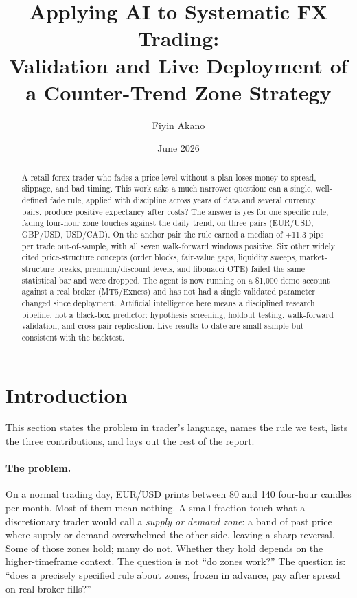 \documentclass[11pt,a4paper]{article}
\title{Applying AI to Systematic FX Trading:\\
Validation and Live Deployment of a Counter-Trend Zone Strategy}
\author{Fiyin Akano}
\date{June 2026}
\begin{document}
\maketitle

\begin{abstract}
A retail forex trader who fades a price level without a plan loses money to
spread, slippage, and bad timing. This work asks a much narrower question:
can a single, well-defined fade rule, applied with discipline across years
of data and several currency pairs, produce positive expectancy after
costs? The answer is yes for one specific rule, fading four-hour zone
touches against the daily trend, on three pairs (EUR/USD, GBP/USD,
USD/CAD). On the anchor pair the rule earned a median of +11.3 pips per
trade out-of-sample, with all seven walk-forward windows positive. Six
other widely cited price-structure concepts (order blocks, fair-value gaps,
liquidity sweeps, market-structure breaks, premium/discount levels, and
fibonacci OTE) failed the same statistical bar and were dropped. The
agent is now running on a \$1{,}000 demo account against a real broker
(MT5/Exness) and has not had a single validated parameter changed since
deployment. Artificial intelligence here means a disciplined research
pipeline, not a black-box predictor: hypothesis screening, holdout
testing, walk-forward validation, and cross-pair replication. Live results
to date are small-sample but consistent with the backtest.
\end{abstract}

\section{Introduction}\label{sec:intro}

This section states the problem in trader's language, names the rule we
test, lists the three contributions, and lays out the rest of the report.

\paragraph{The problem.} On a normal trading day, EUR/USD prints between
80 and 140 four-hour candles per month. Most of them mean nothing.
A small fraction touch what a discretionary trader would call a
\emph{supply or demand zone}: a band of past price where supply or demand
overwhelmed the other side, leaving a sharp reversal. Some of those zones
hold; many do not. Whether they hold depends on the higher-timeframe
context. The question is not \enquote{do zones work?} The question is:
\enquote{does a precisely specified rule about zones, frozen in advance,
pay after spread on real broker fills?}
\end{document}
